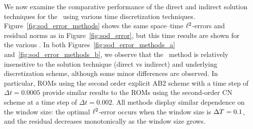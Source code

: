 We now examine the comparative performance of the direct and indirect solution techniques for the \methodAcronymROMs\ using various time discretization techniques. 
Figure~\ref{fig:sod_error_methods} 
shows the same space--time $\ell^2$-errors and residual norms as in Figure~\ref{fig:sod_error}, but this time results are shown for 
the various \methodAcronymROMs. In both Figures~\ref{fig:sod_error_methods_a} and~\ref{fig:sod_error_methods_b}, we observe that the \methodAcronym\ method 
is relatively insensitive to the solution technique (direct vs indirect) and underlying discretization scheme, although some minor differences are observed.
In particular, ROMs using the second order explicit AB2 scheme with a time step of $\Delta t = 0.0005$ provide similar results to the 
ROMs using the second-order CN scheme at a time step of $\Delta t = 0.002$. All methods display similar dependence on the window size: the optimal 
$\ell^2$-error occurs when the window size is $\Delta T^{} = 0.1$, and the residual decreases monotonically as the window size grows. 
